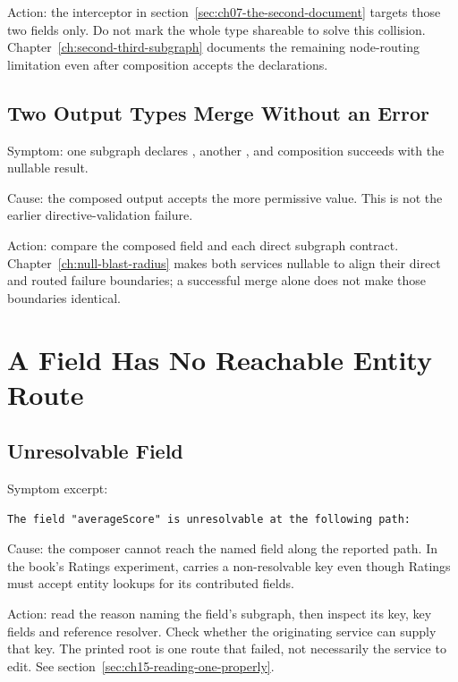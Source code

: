 Action: the  interceptor in
section~\ref{sec:ch07-the-second-document} targets those two fields only.
Do not mark the whole  type shareable to solve this collision.
Chapter~\ref{ch:second-third-subgraph} documents the remaining node-routing
limitation even after composition accepts the declarations.

\subsection*{Two Output Types Merge Without an Error}

Symptom: one subgraph declares \code{[Node]!}, another \code{[Node]}, and
composition succeeds with the nullable result.

Cause: the composed output accepts the more permissive value. This is not
the earlier directive-validation failure.

Action: compare the composed field and each direct subgraph contract.
Chapter~\ref{ch:null-blast-radius} makes both services nullable to align
their direct and routed failure boundaries; a successful merge alone does
not make those boundaries identical.

\section{A Field Has No Reachable Entity Route}

\subsection*{Unresolvable Field}

Symptom excerpt:

\begin{verbatim}
The field "averageScore" is unresolvable at the following path:
\end{verbatim}

Cause: the composer cannot reach the named field along the reported path.
In the book's Ratings experiment,  carries a non-resolvable
key even though Ratings must accept entity lookups for its contributed
fields.

Action: read the reason naming the field's subgraph, then inspect its key,
key fields and reference resolver. Check whether the originating service can
supply that key. The printed root is one route that failed, not necessarily
the service to edit. See section~\ref{sec:ch15-reading-one-properly}.

